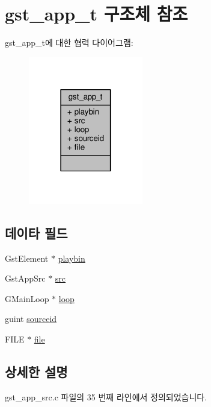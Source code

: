 \hypertarget{structgst__app__t}{}\section{gst\+\_\+app\+\_\+t 구조체 참조}
\label{structgst__app__t}


gst\+\_\+app\+\_\+t에 대한 협력 다이어그램\+:
\nopagebreak
\begin{figure}[H]
\begin{center}
\leavevmode
\includegraphics[width=142pt]{structgst__app__t__coll__graph}
\end{center}
\end{figure}
\subsection*{데이타 필드}
\begin{DoxyCompactItemize}
\item 
Gst\+Element $\ast$ \hyperlink{structgst__app__t_aa5d064c9e5e4066bfce7b7f40ba31f5d}{playbin}
\item 
Gst\+App\+Src $\ast$ \hyperlink{structgst__app__t_a8cb2c1cd92ad959bd105b3bd2ed0c45d}{src}
\item 
G\+Main\+Loop $\ast$ \hyperlink{structgst__app__t_a35126dd286141bc2cc1f045de5e1f81a}{loop}
\item 
guint \hyperlink{structgst__app__t_af1aa180762d2e3eab179a2ac3b90be79}{sourceid}
\item 
F\+I\+LE $\ast$ \hyperlink{structgst__app__t_a702945180aa732857b380a007a7e2a21}{file}
\end{DoxyCompactItemize}


\subsection{상세한 설명}


gst\+\_\+app\+\_\+src.\+c 파일의 35 번째 라인에서 정의되었습니다.



